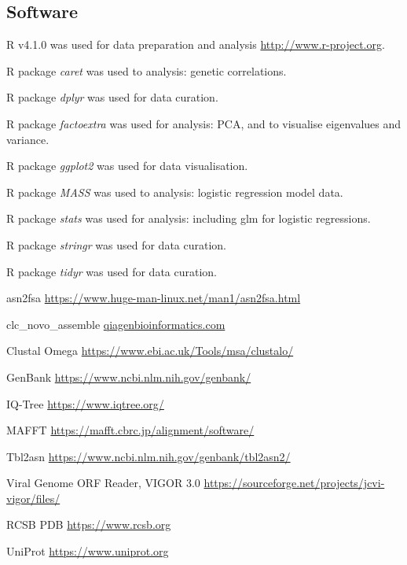 \documentclass{article}
\begin{document}
\subsection{Software}
\begin{description}[noitemsep]

\item R v4.1.0 was used for data preparation and analysis \url{http://www.r-project.org}.
\item R package \textit{caret} was used to analysis: genetic correlations.
\item R package \textit{dplyr} was used for data curation.
\item R package \textit{factoextra} was used for analysis: PCA, and to visualise eigenvalues and variance.
\item R package \textit{ggplot2} was used for data visualisation.
\item R package \textit{MASS} was used to analysis: logistic regression model data.
\item R package \textit{stats} was used for analysis: including glm for logistic regressions. 
\item R package \textit{stringr} was used for data curation.
\item R package \textit{tidyr} was used for data curation.
\item asn2fsa \url{https://www.huge-man-linux.net/man1/asn2fsa.html}
\item clc\_novo\_assemble \href{https://resources.qiagenbioinformatics.com/manuals
/clcgenomicsworkbench/852/index.php?manual=De_novo_assembly.html}{qiagenbioinformatics.com} \
\item Clustal Omega \url{https://www.ebi.ac.uk/Tools/msa/clustalo/}
\item GenBank \url{https://www.ncbi.nlm.nih.gov/genbank/}
\item IQ-Tree \url{https://www.iqtree.org/}
\item MAFFT \url{https://mafft.cbrc.jp/alignment/software/} \cite{katoh2013mafft}
\item Tbl2asn \url{https://www.ncbi.nlm.nih.gov/genbank/tbl2asn2/}
\item Viral Genome ORF Reader, VIGOR 3.0 \url{https://sourceforge.net/projects/jcvi-vigor/files/}
\item RCSB PDB	\url{https://www.rcsb.org}
\item UniProt	\url{https://www.uniprot.org}

\end{description}
\end{document}
